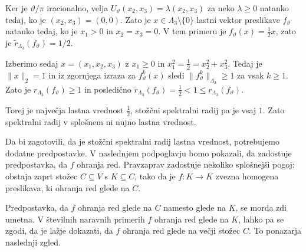 \documentclass[mat2, tisk]{fmfdelo}
\begin{document}
\begin{zgled}
  Ker je $\vartheta/\pi$ iracionalno, velja
  $U_\vartheta(x_2,x_3)=\lambda(x_2,x_3)$ za neko $\lambda\geq0$
  natanko tedaj, ko je $(x_2,x_3)=(0,0)$. Zato je
  $x\in\Lambda_3\setminus\{0\}$ lastni vektor preslikave $f_\vartheta$
  natanko tedaj, ko je $x_1>0$ in $x_2=x_3=0$. V tem primeru je
  $f_\vartheta(x)=\frac12x$, zato je
  $\widetilde r_{\Lambda_3}(f_\vartheta)=1/2$.

  Izberimo sedaj $x=(x_1,x_2,x_3)$ z $x_1\geq0$ in
  $x_1^2=\frac{1}{2}=x_2^2+x_3^2$. Tedaj je $\|x\|_2=1$ in iz zgornjega izraza
  za $f_\vartheta^k(x)$ sledi
  $\|f_\vartheta^k\|_{\Lambda_3}\geq1$ za vsak $k\geq1$. Zato je
  $r_{\Lambda_3}(f_\vartheta)\geq1$ in posledično
  $\widetilde r_{\Lambda_3}(f_\vartheta) = \frac12
  < 1 \leq
  r_{\Lambda_3}(f_\vartheta)$.

  Torej je največja lastna vrednost $\frac{1}{2}$, stožčni spektralni radij pa je vsaj $1$. 
  Zato spektralni radij v splošnem ni nujno lastna vrednost.
\end{zgled}

Da bi zagotovili, da je stožčni spektralni radij lastna vrednost,
potrebujemo dodatne predpostavke. V naslednjem podpoglavju bomo
pokazali, da zadostuje predpostavka, da $f$ ohranja red. Pravzaprav
zadostuje nekoliko splošnejši pogoj: obstaja zaprt stožec
$C\subseteq V$ s $K\subseteq C$, tako da je
$f\colon K\longrightarrow K$ zvezna homogena preslikava, ki ohranja
red glede na $C$.

Predpostavka, da $f$ ohranja red glede na $C$ namesto glede na $K$,
se morda zdi umetna. V številnih naravnih primerih $f$ ohranja red
glede na $K$, lahko pa se zgodi, da je lažje dokazati, da $f$ ohranja
red glede na večji stožec $C$. To ponazarja naslednji zgled.
\end{document}
